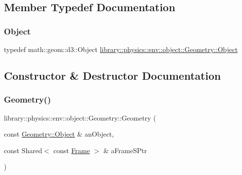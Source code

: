 \subsection{Member Typedef Documentation}
\mbox{\label{classlibrary_1_1physics_1_1env_1_1object_1_1_geometry_a4889a934df09768235fa2d89d0b0b0d6}} 
\subsubsection{\texorpdfstring{Object}{Object}}
{\footnotesize\ttfamily typedef math\+::geom\+::d3\+::\+Object \hyperlink{classlibrary_1_1physics_1_1env_1_1object_1_1_geometry_a4889a934df09768235fa2d89d0b0b0d6}{library\+::physics\+::env\+::object\+::\+Geometry\+::\+Object}}



\subsection{Constructor \& Destructor Documentation}
\mbox{\label{classlibrary_1_1physics_1_1env_1_1object_1_1_geometry_a150ec4f85fe2c76471833df4145b96e8}} 
\subsubsection{\texorpdfstring{Geometry()}{Geometry()}\hspace{0.1cm}{\footnotesize\ttfamily [1/3]}}
{\footnotesize\ttfamily library\+::physics\+::env\+::object\+::\+Geometry\+::\+Geometry (\begin{DoxyParamCaption}\item[{const \hyperlink{classlibrary_1_1physics_1_1env_1_1object_1_1_geometry_a4889a934df09768235fa2d89d0b0b0d6}{Geometry\+::\+Object} \&}]{an\+Object,  }\item[{const Shared$<$ const \hyperlink{classlibrary_1_1physics_1_1coord_1_1_frame}{Frame} $>$ \&}]{a\+Frame\+S\+Ptr }\end{DoxyParamCaption})}



